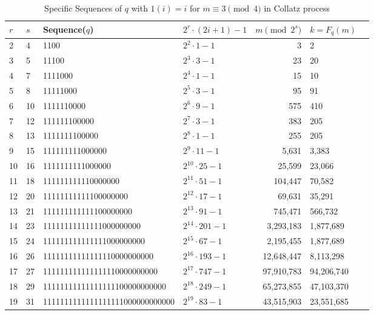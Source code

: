 \documentclass{amsart}
\theoremstyle{definition}
\theoremstyle{remark}
\numberwithin{equation}{section}
\begin{document}
\tiny
\begin{table}[ht]
	\caption{Specific Sequences of $q$ with $1(i)=i$ for $m \equiv 3\pmod{4}$ in Collatz process}
	\label{tab:seq}
\begin{tabular}{p{}p{}p{}p{}rp{}p{}}

		\toprule

		$r$ &  {$s$} & {Sequence($q$)} & {$2^r\cdot(2i+1)-1$} & {$m\pmod{2^s}$} & {$k=F_q(m)$} \\

		\midrule
		2	&	4	&	1100 & {$2^2 \cdot 1-1$} & 3 & 2\\
		3	&	5	&	11100 & {$2^3 \cdot 3-1$} & 23 & 20\\
		4	&	7	&	1111000 & {$2^4 \cdot 1-1$} & 15 & 10\\
		5	&	8	&	11111000 & {$2^5 \cdot 3-1$} & 95 & 91\\
		6	&	10	&	1111110000 & {$2^6 \cdot 9-1$} & 575 & 410\\
		7	&	12	&	111111100000 & {$2^7 \cdot 3-1$} & 383 & 205\\
		8	&	13	&	1111111100000 & {$2^8 \cdot 1-1$} & 255 & 205\\
		9	&	15	&	111111111000000	& {$2^9 \cdot 11-1$} & 5,631 & 3,383\\
		10	&	16	&	1111111111000000 & {$2^{10} \cdot 25-1$} & 25,599 & 23,066\\
		11	&	18	&	111111111110000000 & {$2^{11} \cdot 51-1$} & 104,447 & 70,582\\
		12	&	20	&	11111111111100000000 & {$2^{12} \cdot 17-1$} & 69,631 & 35,291\\
		13	&	21	&	111111111111100000000 & {$2^{13} \cdot 91-1$} & 745,471 & 566,732\\
		14	&	23	&	11111111111111000000000 & {$2^{14} \cdot 201-1$} & 3,293,183 & 1,877,689\\
		15	&	24	&	111111111111111000000000 & {$2^{15} \cdot 67-1$} & 2,195,455 & 1,877,689\\
		16	&	26	&	11111111111111110000000000 & {$2^{16} \cdot 193-1$} & 12,648,447 & 8,113,298\\
		17	&	27	&	111111111111111110000000000 & {$2^{17} \cdot 747-1$} & 97,910,783 & 94,206,740\\
		18	&	29	&	11111111111111111100000000000 & {$2^{18} \cdot 249-1$} & 65,273,855 & 47,103,370\\
		19	&	31	&	1111111111111111111000000000000	& {$2^{19} \cdot 83-1$}  & 43,515,903 & 23,551,685\\

\end{tabular}
\end{table}
\end{document}

